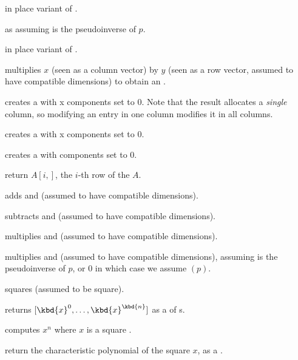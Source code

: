  in place variant of .

 as 
assuming  is the pseudoinverse of $p$.

 in place variant of
.

 multiplies $x$
(seen as a column vector) by $y$ (seen as a row vector,
assumed to have compatible dimensions) to obtain an .

 creates a  with  x 
components set to $0$. Note that the result allocates a
\emph{single} column, so modifying an entry in one column modifies it in
all columns.

 creates a  with  x
 components set to $0$.

 creates a  with  components set to
$0$.

 return $A[i,]$, the $i$-th row of the
 $A$.

 adds  and 
(assumed to have compatible dimensions).

 subtracts  and 
(assumed to have compatible dimensions).

 multiplies   and 
(assumed to have compatible dimensions).

 multiplies   and
 (assumed to have compatible dimensions), assuming  is the
pseudoinverse of $p$, or $0$ in which case we assume $(p)$.

 squares 
(assumed to be square).

 returns
$[\kbd{x}^0, \dots, \kbd{x}^\kbd{n}]$ as a  of s.

 computes $x^n$ where $x$ is a
square .

 return the characteristic polynomial of
the square  $x$, as a .

